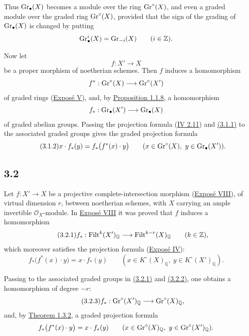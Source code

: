 Thus $\operatorname{Gr}_{\bullet}(X)$ becomes a module over the ring $\operatorname{Gr}^{\circ}(X)$, and even a graded
module over the graded ring $\operatorname{Gr}^{\circ}(X)$, provided that the sign of the grading
of $\operatorname{Gr}_{\bullet}(X)$ is changed by putting
\[
\operatorname{Gr}^i_\bullet(X)=\operatorname{Gr}_{-i}(X)\qquad(i\in\mathbb Z).
\]

Now let
\[
f:X'\longrightarrow X
\]
be a proper morphism of noetherian schemes. Then $f$ induces a homomorphism
\[
f^*:\operatorname{Gr}^{\circ}(X)\longrightarrow\operatorname{Gr}^{\circ}(X')
\]
of graded rings (\hyperlink{sga6.e05.expose}{Expos\'e V}), and, by \hyperlink{sga6.e10.prop.1-1-8}{Proposition 1.1.8}, a homomorphism
\[
f_*:\operatorname{Gr}_{\bullet}(X')\longrightarrow\operatorname{Gr}_{\bullet}(X)
\]
of graded abelian groups. Passing the projection formula (\hyperlink{sga6.e04.para.2-11}{IV 2.11}) and
\hyperlink{sga6.e10.eq.3-1-1}{(3.1.1)} to the associated graded groups gives the graded projection formula
\begin{equation}\tag{3.1.2}
x\cdot f_*(y)=f_*\bigl(f^*(x)\cdot y\bigr)
\qquad(x\in\operatorname{Gr}^{\circ}(X),\ y\in\operatorname{Gr}_{\bullet}(X')).
\end{equation}

\subsection*{3.2}
Let $f:X'\to X$ be a projective complete-intersection morphism (\hyperlink{sga6.e08.expose}{Expos\'e
VIII}), of virtual dimension $r$, between noetherian schemes, with $X$ carrying
an ample invertible $\mathcal O_X$-module. In \hyperlink{sga6.e08.expose}{Expos\'e VIII} it was proved that
$f$ induces a homomorphism
\begin{equation}\tag{3.2.1}
f_*:\operatorname{Filt}^k(X')_{\mathbb Q}\longrightarrow
\operatorname{Filt}^{k-r}(X)_{\mathbb Q}\qquad(k\in\mathbb Z),
\end{equation}
which moreover satisfies the projection formula (\hyperlink{sga6.e04.expose}{Expos\'e IV}):
\begin{equation}\tag{3.2.2}
f_*\bigl(f^*(x)\cdot y\bigr)=x\cdot f_*(y)
\qquad(x\in K^\circ(X)_{\mathbb Q},\ y\in K^\circ(X')_{\mathbb Q}).
\end{equation}

Passing to the associated graded groups in \hyperlink{sga6.e10.eq.3-2-1}{(3.2.1)} and \hyperlink{sga6.e10.eq.3-2-2}{(3.2.2)}, one obtains a
homomorphism of degree $-r$:
\begin{equation}\tag{3.2.3}
f_*:\operatorname{Gr}^{\circ}(X')_{\mathbb Q}\longrightarrow\operatorname{Gr}^{\circ}(X)_{\mathbb Q},
\end{equation}
and, by \hyperlink{sga6.e10.thm.1-3-2}{Theorem 1.3.2}, a graded projection formula
\[
f_*\bigl(f^*(x)\cdot y\bigr)=x\cdot f_*(y)
\qquad(x\in\operatorname{Gr}^{\circ}(X)_{\mathbb Q},\ y\in\operatorname{Gr}^{\circ}(X')_{\mathbb Q}).
\]

